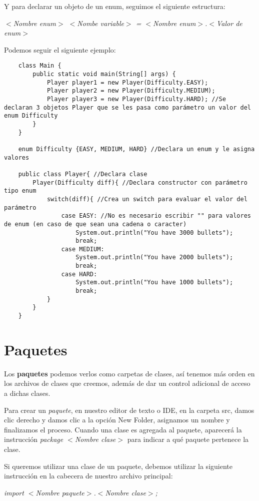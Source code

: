 Y para declarar un objeto de un enum, seguimos el siguiente estructura:
\begin{center}
    \textit{$<$Nombre enum$>$ $<$Nombe variable$>$ = $<$Nombre enum$>$.$<$Valor de enum$>$}
\end{center}

Podemos seguir el siguiente ejemplo:
\begin{lstlisting}
    class Main {
        public static void main(String[] args) {
            Player player1 = new Player(Difficulty.EASY);
            Player player2 = new Player(Difficulty.MEDIUM);
            Player player3 = new Player(Difficulty.HARD); //Se declaran 3 objetos Player que se les pasa como parámetro un valor del enum Difficulty
        }
    }

    enum Difficulty {EASY, MEDIUM, HARD} //Declara un enum y le asigna valores

    public class Player{ //Declara clase
        Player(Difficulty diff){ //Declara constructor con parámetro tipo enum
            switch(diff){ //Crea un switch para evaluar el valor del parámetro
                case EASY: //No es necesario escribir "" para valores de enum (en caso de que sean una cadena o caracter)
                    System.out.println("You have 3000 bullets");
                    break;
                case MEDIUM:
                    System.out.println("You have 2000 bullets");
                    break;
                case HARD:
                    System.out.println("You have 1000 bullets");
                    break;
            }
        }
    }
\end{lstlisting}



\section{Paquetes}
\hspace{0.55cm}Los \textbf{paquetes} podemos verlos como carpetas de clases, así tenemos más orden en los archivos de clases que creemos, además de dar un control adicional de acceso a dichas clases.

Para crear un \textit{paquete}, en nuestro editor de texto o IDE, en la carpeta src, damos clic derecho y damos clic a la opción New Folder, asignamos un nombre y finalizamos el proceso. Cuando una clase es agregada al paquete, aparecerá la instrucción \textit{package $<$Nombre clase$>$} para indicar a qué paquete pertenece la clase.

Si queremos utilizar una clase de un paquete, debemos utilizar la siguiente instrucción en la cabecera de nuestro archivo principal:
\begin{center}
    \textit{import $<$Nombre paquete$>$.$<$Nombre clase$>$;}
\end{center}

